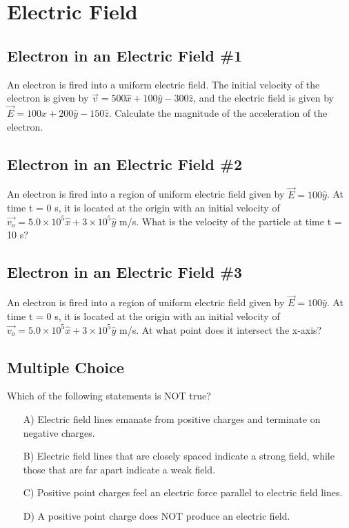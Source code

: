 \documentclass[11pt]{article}
\begin{document}

\pagebreak
\section{Electric Field}

\subsection{Electron in an Electric Field \#1}
An electron is fired into a uniform electric field.  The initial velocity of the electron is given by $\vec{v} = 500 \hat{x} + 100 \hat{y} - 300 \hat{z}$, and the electric field is given by $\vec{E} = 100 \hat{x} + 200 \hat{y} - 150 \hat{z}$.  Calculate the magnitude of the acceleration of the electron.

\subsection{Electron in an Electric Field \#2}
An electron is fired into a region of uniform electric field given by $\vec{E} = 100\hat{y}$. At time t = 0 s, it is located at the origin with an initial velocity of $\vec{v_o} = 5.0 \times 10^5 \hat{x} + 3 \times 10^5 \hat{y}$ m/s.  What is the velocity of the particle at time t = 10 s?

\subsection{Electron in an Electric Field \#3}
An electron is fired into a region of uniform electric field given by $\vec{E} = 100\hat{y}$. At time t = 0 s, it is located at the origin with an initial velocity of $\vec{v_o} = 5.0 \times 10^5 \hat{x} + 3 \times 10^5 \hat{y}$ m/s.  At what point does it intersect the x-axis?

\subsection{Multiple Choice}
Which of the following statements is NOT true?

\begin{itemize}
	\item[A)] Electric field lines emanate from positive charges and terminate on negative charges.
	\item[B)] Electric field lines that are closely spaced indicate a strong field, while those that are far apart indicate a weak field.
	\item[C)] Positive point charges feel an electric force parallel to electric field lines.
	\item[D)] A positive point charge does NOT produce an electric field.
\end{itemize}
\end{document}
